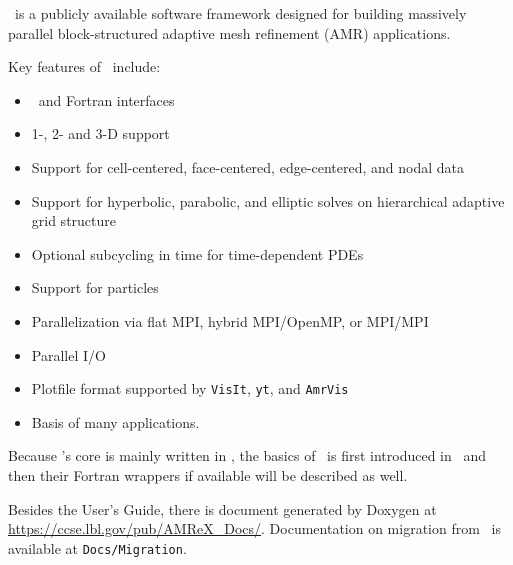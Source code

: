 \amrex\ is a publicly available software framework designed for
building massively parallel block-structured adaptive mesh refinement
(AMR) applications.

Key features of \amrex\ include:
\begin{itemize}
\item \cpp\ and Fortran interfaces
\item 1-, 2- and 3-D support
\item Support for cell-centered, face-centered, edge-centered, and
  nodal data
\item Support for hyperbolic, parabolic, and elliptic solves on
  hierarchical adaptive grid structure
\item Optional subcycling in time for time-dependent PDEs
\item Support for particles
\item Parallelization via flat MPI, hybrid MPI/OpenMP, or MPI/MPI
\item Parallel I/O
\item Plotfile format supported by {\tt VisIt}, {\tt yt}, and {\tt AmrVis}
\item Basis of many applications.
\end{itemize}

Because \amrex's core is mainly written in \cpp, the basics of \amrex\
is first introduced in \cpp\ and then their Fortran wrappers if
available will be described as well.  

Besides the User's Guide, there is document generated by Doxygen at
\url{https://ccse.lbl.gov/pub/AMReX_Docs/}.  Documentation on
migration from \boxlib\ is available at {\tt Docs/Migration}.
